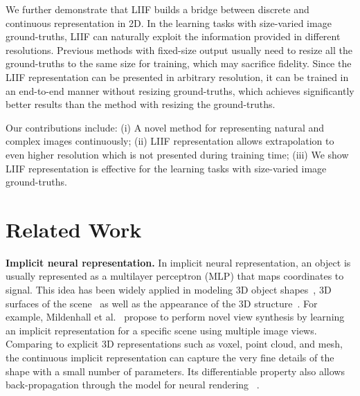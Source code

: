 \documentclass[final]{cvpr}
\begin{document}
We further demonstrate that LIIF builds a bridge between discrete and continuous representation in 2D. In the learning tasks with size-varied image ground-truths, LIIF can naturally exploit the information provided in different resolutions. Previous methods with fixed-size output usually need to resize all the ground-truths to the same size for training, which may sacrifice fidelity. Since the LIIF representation can be presented in arbitrary resolution, it can be trained in an end-to-end manner without resizing ground-truths, which achieves significantly better results than the method with resizing the ground-truths.

Our contributions include: (i) A novel method for representing natural and complex images continuously; (ii) LIIF representation allows extrapolation to even  higher resolution which is not presented during training time; (iii) We show LIIF representation is effective for the learning tasks with size-varied image ground-truths.

\section{Related Work}

\textbf{Implicit neural representation.} In implicit neural representation, an object is usually represented as a multilayer perceptron (MLP) that maps coordinates to signal. This idea has been widely applied in modeling 3D object shapes~\cite{chen2019learning,michalkiewicz2019implicit,atzmon2020sal,gropp2020implicit}, 3D surfaces of the scene~\cite{sitzmann2019scene,jiang2020local,peng2020convolutional,chabra2020deep} as well as the appearance of the 3D structure~\cite{oechsle2019texture,niemeyer2020differentiable,mildenhall2020nerf}. For example, Mildenhall et al.~\cite{mildenhall2020nerf} propose to perform novel view synthesis by learning an implicit representation for a specific scene using multiple image views. Comparing to explicit 3D representations such as voxel, point cloud, and mesh, the continuous implicit representation can capture the very fine details of the shape with a small number of parameters. Its differentiable property also allows back-propagation through the model for neural rendering~\cite{sitzmann2019scene} . 
\end{document}
